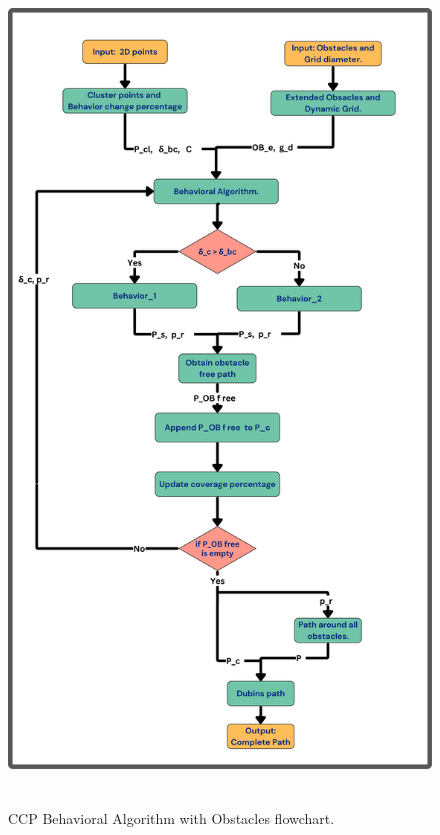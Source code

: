 \begin{figure}[H]
    \centering
    \includegraphics[height=22cm, width=\textwidth]{Images/flowchart/obs_flowchart.pdf}
    \caption{CCP Behavioral Algorithm with Obstacles flowchart.}
    \label{fig:ccp_flowchart_obs} 
\end{figure} 